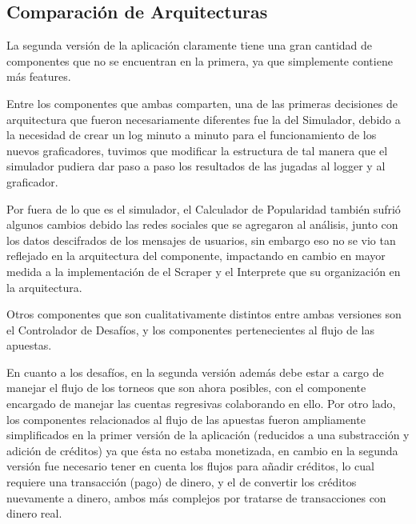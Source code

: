 \subsection{Comparaci\'on de Arquitecturas}

La segunda versi\'on de la aplicaci\'on claramente tiene una gran cantidad de componentes que no se encuentran en la primera, ya que simplemente contiene m\'as features.

Entre los componentes que ambas comparten, una de las primeras decisiones de arquitectura que fueron necesariamente diferentes fue la del Simulador, debido a la necesidad de crear un log minuto a minuto para el funcionamiento de los nuevos graficadores, tuvimos que modificar la estructura de tal manera que el simulador pudiera dar paso a paso los resultados de las jugadas al logger y al graficador.

Por fuera de lo que es el simulador, el Calculador de Popularidad tambi\'en sufri\'o algunos cambios debido las redes sociales que se agregaron al an\'alisis, junto con los datos descifrados de los mensajes de usuarios, sin embargo eso no se vio tan reflejado en la arquitectura del componente, impactando en cambio en mayor medida a la implementaci\'on de el Scraper y el Interprete que su organizaci\'on en la arquitectura.

Otros componentes que son cualitativamente distintos entre ambas versiones son el Controlador de Desaf\'ios, y los componentes pertenecientes al flujo de las apuestas.

En cuanto a los desaf\'ios, en la segunda versi\'on adem\'as debe estar a cargo de manejar el flujo de los torneos que son ahora posibles, con el componente encargado de manejar las cuentas regresivas colaborando en ello. Por otro lado, los componentes relacionados al flujo de las apuestas fueron ampliamente simplificados en la primer versi\'on de la aplicaci\'on (reducidos a una substracci\'on y adici\'on de cr\'editos) ya que \'esta no estaba monetizada, en cambio en la segunda versi\'on fue necesario tener en cuenta los flujos para a\~nadir cr\'editos, lo cual requiere una transacci\'on (pago) de dinero, y el de convertir los cr\'editos nuevamente a dinero, ambos m\'as complejos por tratarse de transacciones con dinero real.
